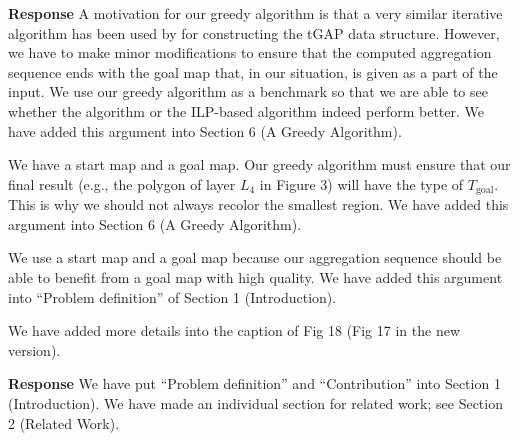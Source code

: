 \documentclass[a4paper,twoside,11pt]{reviewresponse}
\begin{document}
\textbf{Response} 
A motivation for our greedy algorithm is that 
a very similar iterative algorithm has been used by
\textcite{vanOosterom1995Development} 
for constructing the tGAP data structure.
However, we have to make minor modifications to ensure that 
the computed aggregation sequence ends with the goal map that, 
in our situation, is given as a part of the input.
We use our greedy algorithm as a benchmark
so that we are able to see 
whether the \Astar algorithm or the ILP-based algorithm 
indeed perform better.
We have added this argument into Section 6 (A Greedy Algorithm).

We have a start map and a goal map.
Our greedy algorithm must ensure that 
our final result (e.g., the polygon of layer $L_4$ in
Figure 3) will have the type of $T_\mathrm{goal}$.
This is why we should not always recolor the smallest region.
We have added this argument into Section 6 (A Greedy Algorithm).

We use a start map and a goal map because 
our aggregation sequence should be able to 
benefit from a goal map with high quality.
We have added this argument 
into ``Problem definition'' of Section 1 (Introduction).

We have added more details 
into the caption of Fig 18 (Fig 17 in the new version).


\textbf{Response}
We have put ``Problem definition'' and ``Contribution'' 
into Section 1 (Introduction).
We have made an individual section for related work;
see Section 2 (Related Work).
\end{document}
